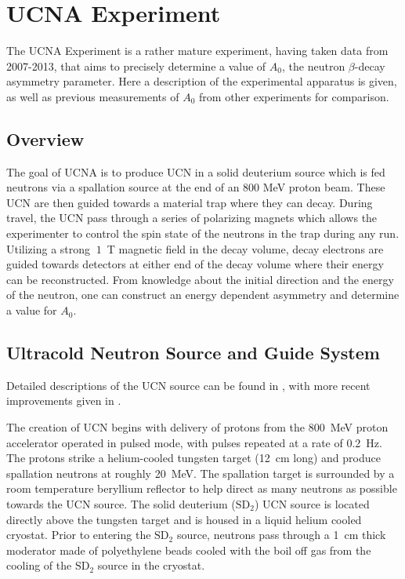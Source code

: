 \chapter{UCNA Experiment}
\label{ch:UCNA_Experiment}

The UCNA Experiment is a rather mature experiment, having taken data from
2007-2013, that aims to precisely determine a value of $A_{0}$, the neutron
$\beta$-decay asymmetry parameter. Here a description of the experimental
apparatus is given, as well as previous measurements
of $A_{0}$ from other experiments for comparison.


\section{Overview}
\label{sec:Overview}

The goal of UCNA is to produce UCN in a solid deuterium source which is fed
neutrons via a spallation source at the end of an $800$ MeV
proton beam. These UCN are then guided towards a material trap where they can
decay. During travel, the UCN pass through a series of polarizing magnets
which allows the experimenter to control the spin state of the neutrons in
the trap during any run. Utilizing a strong $~1$~T magnetic field in the
decay volume, decay electrons are guided towards detectors at either end of
the decay volume where their energy can be reconstructed. From knowledge about
the initial direction and the energy of the neutron, one can construct an
energy dependent asymmetry and determine a value for $A_{0}$.

\section{Ultracold Neutron Source and Guide System}
Detailed descriptions of the UCN source can be found in
\cite{saunders2004demonstration,morris2002measurements,saunders2013performance}, with
more recent improvements given in \cite{ito2017performance}.

The creation of UCN begins with delivery of protons from the 800~MeV proton
accelerator operated in pulsed mode, with pulses repeated at a rate of 0.2~Hz.
The protons strike a helium-cooled tungsten target (12~cm long) and produce
spallation neutrons at roughly 20~MeV. The spallation target is surrounded by
a room temperature beryllium reflector to help direct as many neutrons as
possible towards the UCN source. The solid deuterium ($\mathrm{SD}_2$) UCN source
is located directly above the tungsten target and is housed in a liquid helium
cooled cryostat. Prior to entering the $\mathrm{SD}_2$ source, neutrons
pass through a 1~cm thick moderator made of polyethylene beads cooled with the boil off gas
from the cooling of the $\mathrm{SD}_2$ source in the cryostat.

